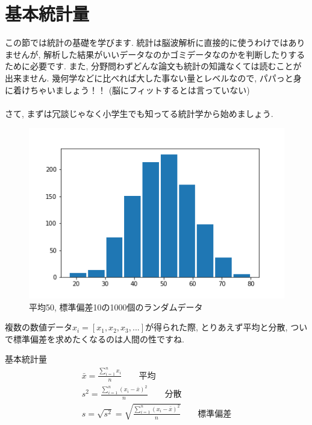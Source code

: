 \documentclass[11pt,a4paper]{jreport}
\begin{document}
\section{基本統計量}
この節では統計の基礎を学びます. 統計は脳波解析に直接的に使うわけではありませんが, 解析した結果がいいデータなのかゴミデータなのかを判断したりするために必要です. また, 分野問わずどんな論文も統計の知識なくては読むことが出来ません. 幾何学などに比べれば大した事ない量とレベルなので, パパっと身に着けちゃいましょう！！ (脳にフィットするとは言っていない)\\
\\
さて, まずは冗談じゃなく小学生でも知ってる統計学から始めましょう.\\

\begin{figure}[H]
\label{im:histgram}
  \centering
  \includegraphics[width=120mm,bb=0 0 432 288]{../figures/hist.png}
  \caption{平均50, 標準偏差10の1000個のランダムデータ}
\end{figure}

複数の数値データ$x_i = [x_1, x_2, x_3, ...]$が得られた際, とりあえず平均と分散, ついで標準偏差を求めたくなるのは人間の性ですね.\\

\begin{screen}
基本統計量
\begin{eqnarray}
\label{eq:ave}
\bar{x} = \frac{\sum_{i=1}^{n} x_i}{n}  \qquad \text{平均}\\
\label{eq:var}
s^2 = \frac{\sum_{i=1}^{n} (x_i - \bar{x})^2}{n} \qquad \text{分散}\\
\label{eq:dev}
s = \sqrt{s^2} = \sqrt{\frac{\sum_{i=1}^{n} (x_i - \bar{x})^2}{n}} \qquad \text{標準偏差}
\end{eqnarray}
\end{screen}
\end{document}
